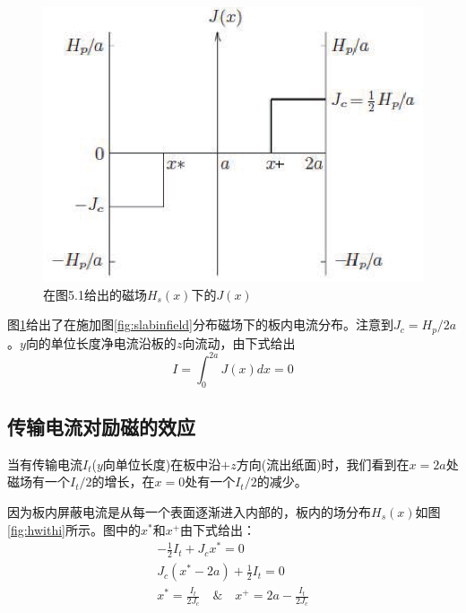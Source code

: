 \begin{figure}[htbp]
  \centering
 \includegraphics[scale=0.8]{chpt5/figs/fig5.4.eps}
  \caption{在图5.1给出的磁场$H_s(x)$下的$J(x)$}\label{fig:jtoh}
\end{figure}
图\ref{fig:jtoh}给出了在施加图\ref{fig:slabinfield}分布磁场下的板内电流分布。注意到$J_c=H_p /2a$。$y$向的单位长度净电流沿板的$z$向流动，由下式给出
\begin{equation}
  I=\int_{0}^{2a} J(x)dx=0
\end{equation}

\subsection{传输电流对励磁的效应}
当有传输电流$I_t$($y$向单位长度)在板中沿$+z$方向(流出纸面)时，我们看到在$x=2a$处磁场有一个$I_t/2$的增长，在$x=0$处有一个$I_t/2$的减少。

因为板内屏蔽电流是从每一个表面逐渐进入内部的，板内的场分布$H_s(x)$如图\ref{fig:hwithi}所示。图中的$x^*$和$x^+$由下式给出：
\begin{subequations}
	\begin{align}
  -\frac{1}{2}I_t + J_c x^* = 0 \\ 
J_c(x^*-2a)+\frac{1}{2}I_t = 0 \\ 
x^*=\frac{I_t}{2J_c}\quad \& \quad x^+ = 2a-\frac{I_t}{2J_c}
	\end{align}
\end{subequations}

